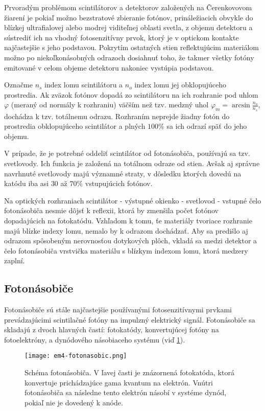 \documentclass[../../main.tex]{subfiles}
\begin{document}
Prvoradým problémom scintilátorov a detektorov založených na Čerenkovovom žiarení je pokiaľ možno bezstratové zbieranie fotónov, prináležiacich obvykle do blízkej ultrafialovej alebo modrej viditeľnej oblasti svetla, z objemu detektoru a sústrediť ich na vhodný fotosenzitívny prvok, ktorý je v optickom kontakte najčastejšie s jeho podstavou. Pokrytím ostatných stien reflektujúcim materiálom možno po niekoľkonásobných odrazoch dosiahnuť toho, že takmer všetky fotóny emitované v celom objeme detektoru nakoniec vystúpia podstavou.

Označme $n_s$ index lomu scintilátoru a $n_o$ index lomu jej obklopujúceho prostredia. Ak zväzok fotónov dopadá zo scintilátoru na ich rozhranie pod uhlom $\varphi$ (meraný od normály k rozhraniu) väčším než tzv. medzný uhol $\varphi_m=\arcsin \frac{n_o}{n_s}$, dochádza k tzv. totálnemu odrazu. Rozhraním neprejde žiadny fotón do prostredia obklopujúceho scintilátor a plných $100\%$ sa ich odrazí späť do jeho objemu.

V prípade, že je potrebné oddeliť scintilátor od fotonásobiča, používajú sa tzv. svetlovody. Ich funkcia je založená na totálnom odraze od stien. Avšak aj správne navrhnuté svetlovody majú významné straty, v dôsledku ktorých dovedú na katódu iba asi $30$ až $70\%$ vstupujúcich fotónov.

Na optických rozhraniach scintilátor - výstupné okienko - svetlovod - vstupné čelo fotonásobiča nesmie dôjsť k reflexii, ktorá by zmenšila počet fotónov dopadajúcich na fotokatódu. Vzhľadom k tomu, ťe materiály tvoriace rozhranie majú blízke indexy lomu, nemalo by k odrazom dochádzať. Aby sa predišlo aj odrazom spôsobeným nerovnosťou dotykových plôch, vkladá sa medzi detektor a čelo fotonásobiča vrstvička materiálu s blízkym indexom lomu, ktorá medzery zaplní.

\subsection{Fotonásobiče}

Fotonásobiče sú stále najčastejšie používanými fotosenzitívnymi prvkami prevádzajúcimi scintilačné fotóny na impulzný elektrický signál. Fotonásobiče sa skladajú z dvoch hlavných častí: fotokatódy, konvertujúcej fotóny na fotoelektróny, a dynódového násobiaceho systému (viď \ref{em4:img:fotonasobic}).

\begin{figure}[h]
\centering
\texttt{[image: em4-fotonasobic.png]}
\caption{Schéma fotonásobiča. V ľavej časti je znázornená fotokatóda, ktorá konvertuje prichádzajúce gama kvantum na elektrón. Vnútri fotonásobiča sa následne tento elektrón násobí v systéme dynód, pokiaľ nie je dovedený k anóde.}
\label{em4:img:fotonasobic}
\end{figure}
\end{document}
